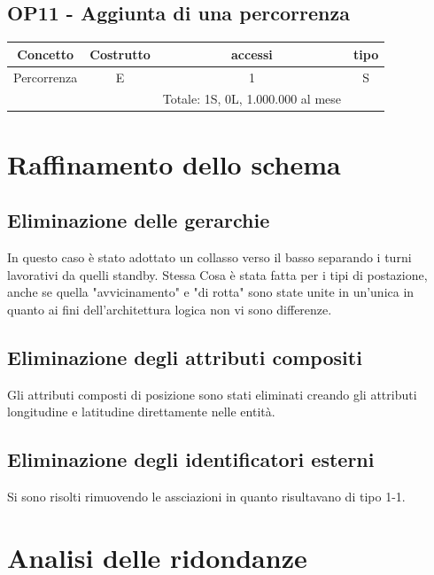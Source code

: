     \subsection*{OP11 - Aggiunta di una percorrenza}
    \begin{table}[H]
    \centering
    \begin{tabular}{|c|c|c|c|}
    \hline
    \rowcolor{green!70!black!80}
    \textbf{Concetto} & \textbf{Costrutto} & \textbf{accessi} & \textbf{tipo}\\
    \hline
    Percorrenza & E & 1 & S \\\
    & & Totale: 1S, 0L, 1.000.000 al mese &\\
    \hline
    \end{tabular}
    \end{table}
  
\section{Raffinamento dello schema}
\subsection*{Eliminazione delle gerarchie}
In questo caso è stato adottato un collasso verso il basso separando i turni lavorativi da quelli standby. 
Stessa Cosa è stata fatta per i tipi di postazione, anche se quella "avvicinamento" e "di rotta" sono state unite in un'unica in quanto ai fini dell'architettura logica non vi sono differenze.
\subsection*{Eliminazione degli attributi compositi}
Gli attributi composti di posizione sono stati eliminati creando gli attributi longitudine e latitudine direttamente nelle entità.
\subsection*{Eliminazione degli identificatori esterni}
Si sono risolti rimuovendo le assciazioni in quanto risultavano di tipo 1-1.
\section{Analisi delle ridondanze}
